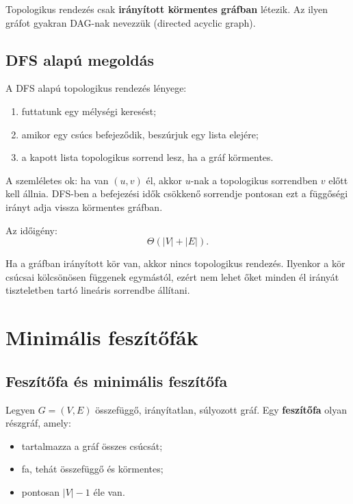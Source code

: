 Topologikus rendezés csak \textbf{irányított körmentes gráfban} létezik. Az ilyen gráfot gyakran DAG-nak nevezzük (directed acyclic graph).

\subsection{DFS alapú megoldás}

A DFS alapú topologikus rendezés lényege:

\begin{enumerate}
  \item futtatunk egy mélységi keresést;
  \item amikor egy csúcs befejeződik, beszúrjuk egy lista elejére;
  \item a kapott lista topologikus sorrend lesz, ha a gráf körmentes.
\end{enumerate}

A szemléletes ok: ha van $(u,v)$ él, akkor $u$-nak a topologikus sorrendben $v$ előtt kell állnia. DFS-ben a befejezési idők csökkenő sorrendje pontosan ezt a függőségi irányt adja vissza körmentes gráfban.


Az időigény:
\[
\Theta(|V|+|E|).
\]

\begin{warningbox}
Ha a gráfban irányított kör van, akkor nincs topologikus rendezés. Ilyenkor a kör csúcsai kölcsönösen függenek egymástól, ezért nem lehet őket minden él irányát tiszteletben tartó lineáris sorrendbe állítani.
\end{warningbox}

\section{Minimális feszítőfák}

\subsection{Feszítőfa és minimális feszítőfa}

Legyen $G=(V,E)$ összefüggő, irányítatlan, súlyozott gráf. Egy \textbf{feszítőfa} olyan részgráf, amely:

\begin{itemize}
  \item tartalmazza a gráf összes csúcsát;
  \item fa, tehát összefüggő és körmentes;
  \item pontosan $|V|-1$ éle van.
\end{itemize}

